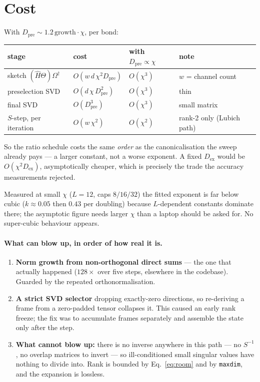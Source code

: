 \documentclass[11pt,a4paper]{article}
\newcommand{\Hb}{\hat{H}}
\newcommand{\Theb}{\Theta}
\newcommand{\Om}{\Omega}
\newcommand{\Dex}{D_{\mathrm{ex}}}
\newcommand{\Dpre}{D_{\mathrm{pre}}}
\newcommand{\code}[1]{\texttt{\small #1}}
\begin{document}
\section{Cost}

With $\Dpre \sim 1.2\,\text{growth}\cdot\chi$, per bond:

\begin{center}
\begin{tabular}{@{}llll@{}}
\toprule
stage & cost & with $\Dpre \propto \chi$ & note \\
\midrule
sketch $(\Hb\Theb)\Om^\dagger$ & $O(w\,d\,\chi^2 \Dpre)$ & $O(\chi^3)$ & $w$ = channel count \\
preselection SVD & $O(d\,\chi\, \Dpre^2)$ & $O(\chi^3)$ & thin \\
final SVD & $O(\Dpre^3)$ & $O(\chi^3)$ & small matrix \\
$S$-step, per iteration & $O(w\,\chi^2)$ & $O(\chi^2)$ & rank-2 only (Lubich path) \\
\bottomrule
\end{tabular}
\end{center}

\noindent
So the ratio schedule costs the same \emph{order} as the canonicalisation the sweep already
pays --- a larger constant, not a worse exponent. A fixed $\Dex$ would be $O(\chi^2 \Dex)$,
asymptotically cheaper, which is precisely the trade the accuracy measurements rejected.

Measured at small $\chi$ ($L=12$, caps $8/16/32$) the fitted exponent is far below cubic
($k \approx 0.05$ then $0.43$ per doubling) because $L$-dependent constants dominate there; the
asymptotic figure needs larger $\chi$ than a laptop should be asked for. No super-cubic
behaviour appears.

\paragraph{What can blow up, in order of how real it is.}
\begin{enumerate}[leftmargin=1.4em]
\item \textbf{Norm growth from non-orthogonal direct sums} --- the one that actually happened
($128\times$ over five steps, elsewhere in the codebase). Guarded by the repeated
orthonormalisation.
\item \textbf{A strict SVD selector} dropping exactly-zero directions, so re-deriving a frame
from a zero-padded tensor collapses it. This caused an early rank freeze; the fix was to
accumulate frames separately and assemble the state only after the step.
\item \textbf{What cannot blow up:} there is no inverse anywhere in this path --- no $S^{-1}$,
no overlap matrices to invert --- so ill-conditioned small singular values have nothing to
divide into. Rank is bounded by Eq.~\eqref{eq:room} and by \code{maxdim}, and the expansion is
lossless.
\end{enumerate}
\end{document}
